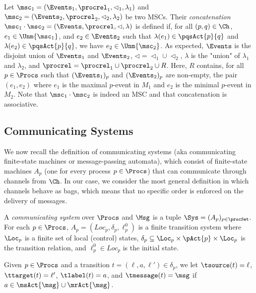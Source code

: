 Let $\msc_1 = (\Events_1,\procrel_1,\lhd_1,\lambda_1)$ and
$\msc_2 = (\Events_2,\procrel_2,\lhd_2,\lambda_2)$ be two MSCs.
Their \emph{concatenation} $\msc_1 \cdot \msc_2 = (\Events,\procrel,\lhd,\lambda)$ is defined if, for all $(p,q) \in \Ch$,
$e_1 \in \Unm{\msc_1}$, and
$e_2 \in \Events_2$ such that $\lambda(e_1) \in \pqsAct{p}{q}$
and $\lambda(e_2) \in \pqsAct{p}{q}$,
we have $e_2 \in \Unm{\msc_2}$.
As expected, $\Events$ is the disjoint union of $\Events_1$ and $\Events_2$,
${\lhd}  = {\lhd_1} \cup {\lhd_2}$, $\lambda$ is the "union" of $\lambda_1$
and $\lambda_2$, and ${\procrel} = {\procrel_1} \cup {\procrel_2} \cup R$.
Here, $R$ contains, for all $p \in \Procs$ such that $(\Events_1)_p$ and
$(\Events_2)_p$ are non-empty, the pair $(e_1,e_2)$ where $e_1$ is the
maximal $p$-event in $M_1$ and $e_2$ is the minimal $p$-event in $M_2$.
Note that $\msc_1 \cdot \msc_2$ is indeed an MSC and that
concatenation is associative.



\subsection{Communicating Systems}

We now recall the definition of communicating systems (aka communicating finite-state
machines or message-passing automata), which consist of finite-state machines $A_p$
(one for every process $p \in \Procs$) that can communicate through channels from $\Ch$. In our case, we consider the most general definition in which channels behave as bags, which means that no specific order is enforced on the delivery of messages.

\begin{definition}\label{def:cs}
A \emph{communicating system} over $\Procs$ and $\Msg$ is a tuple
   $ \Sys = (A_p)_{p\in\procSet}$. For each
   $p \in \Procs$, $A_p = (Loc_p, \delta_p, \ell^0_p)$ is a finite transition system where
   $\Loc_p$ is a finite set of local (control) states, $\delta_p
   \subseteq \Loc_p \times \pAct{p} \times \Loc_p$ is the
   transition relation, and $\ell^0_p \in Loc_p$ is the initial state.
\end{definition}

Given $p \in \Procs$ and a transition $t = (\ell,a,\ell') \in \delta_p$, we let
$\tsource(t) = \ell$, $\ttarget(t) = \ell'$, $\tlabel(t) = a$, and
$\tmessage(t) = \msg$ if $a \in \msAct{\msg} \cup \mrAct{\msg}$.

\smallskip

